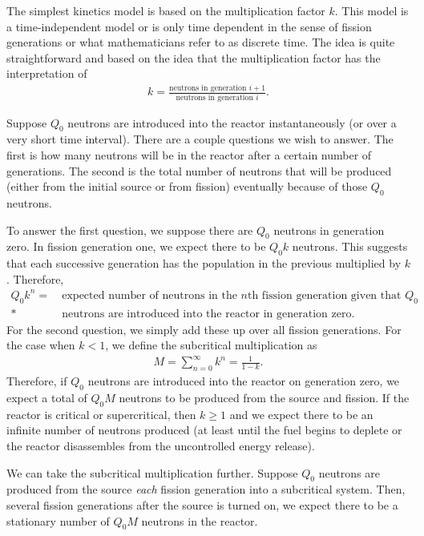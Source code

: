 The simplest kinetics model is based on the multiplication factor $k$. This model is a time-independent model or is only time dependent in the sense of fission generations or what mathematicians refer to as discrete time. The idea is quite straightforward and based on the idea that the multiplication factor has the interpretation of
\begin{align}
  k = \frac{\text{neutrons in generation $i+1$}}{\text{neutrons in generation $i$}}. \nonumber
\end{align}

Suppose $Q_0$ neutrons are introduced into the reactor instantaneously (or over a very short time interval). There are a couple questions we wish to answer. The first is how many neutrons will be in the reactor after a certain number of generations. The second is the total number of neutrons that will be produced (either from the initial source or from fission) eventually because of those $Q_0$ neutrons. 

To answer the first question, we suppose there are $Q_0$ neutrons in generation zero. In fission generation one, we expect there to be $Q_0 k$ neutrons. This suggests that each successive generation has the population in the previous multiplied by $k$. Therefore,
\begin{align}
  Q_0 k^n = 
  &\ \text{expected number of neutrons in the $n$th fission generation given that $Q_0$} \nonumber \\*
  &\ \text{neutrons are introduced into the reactor in generation zero.} \nonumber
\end{align}
For the second question, we simply add these up over all fission generations. For the case when $k < 1$, we define the subcritical multiplication as
\begin{align}
  M = \sum_{n=0}^\infty k^n = \frac{ 1 }{ 1 - k } .
\end{align}
Therefore, if $Q_0$ neutrons are introduced into the reactor on generation zero, we expect a total of $Q_0 M$ neutrons to be produced from the source and fission. If the reactor is critical or supercritical, then $k \ge 1$ and we expect there to be an infinite number of neutrons produced (at least until the fuel begins to deplete or the reactor disassembles from the uncontrolled energy release). 

We can take the subcritical multiplication further. Suppose $Q_0$ neutrons are produced from the source \emph{each} fission generation into a subcritical system. Then, several fission generations after the source is turned on, we expect there to be a stationary number of $Q_0 M$ neutrons in the reactor. 

